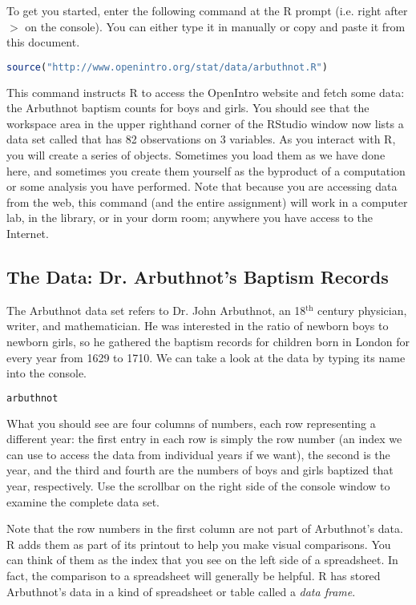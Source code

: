 \documentclass[11pt]{article}
\begin{document}
To get you started, enter the following command at the R prompt (i.e. right after $>$ on the console).  You can either type it in manually or copy and paste it from this document.

\begin{lstlisting}[language=R]
source("http://www.openintro.org/stat/data/arbuthnot.R")
\end{lstlisting}

This command instructs R to access the OpenIntro website and fetch some data: the Arbuthnot baptism counts for boys and girls. You should see that the workspace area in the upper righthand corner of the RStudio window now lists a data set called  that has 82 observations on 3 variables. As you interact with R, you will create a series of objects. Sometimes you load them as we have done here, and sometimes you create them yourself as the byproduct of a computation or some analysis you have performed. Note that because you are accessing data from the web, this command (and the entire assignment) will work in a computer lab, in the library, or in your dorm room; anywhere you have access to the Internet.


\subsection*{The Data: Dr. Arbuthnot's Baptism Records}

The Arbuthnot data set refers to Dr. John Arbuthnot, an 18$^{\textrm{th}}$ century physician, writer, and mathematician.  He was interested in the ratio of newborn boys to newborn girls, so he gathered the baptism records for children born in London for every year from 1629 to 1710.  We can take a look at the data by typing its name into the console.

\begin{lstlisting}[language=R]
arbuthnot
\end{lstlisting}

What you should see are four columns of numbers, each row representing a different year: the first entry in each row is simply the row number (an index we can use to access the data from individual years if we want), the second is the year, and the third and fourth are the numbers of boys and girls baptized that year, respectively. Use the scrollbar on the right side of the console window to examine the complete data set.

Note that the row numbers in the first column are not part of Arbuthnot's data. R adds them as part of its printout to help you make visual comparisons. You can think of them as the index that you see on the left side of a spreadsheet. In fact, the comparison to a spreadsheet will generally be helpful. R has stored Arbuthnot's data in a kind of spreadsheet or table called a \emph{data frame}.
\end{document}
